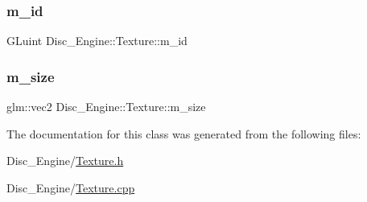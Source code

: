 \subsubsection{\texorpdfstring{m\+\_\+id}{m\_id}}
{\footnotesize\ttfamily G\+Luint Disc\+\_\+\+Engine\+::\+Texture\+::m\+\_\+id\hspace{0.3cm}{\ttfamily [private]}}

\mbox{\label{class_disc___engine_1_1_texture_a400d4a50bbdee9742fe6dbb15331ab17}} 
\subsubsection{\texorpdfstring{m\+\_\+size}{m\_size}}
{\footnotesize\ttfamily glm\+::vec2 Disc\+\_\+\+Engine\+::\+Texture\+::m\+\_\+size\hspace{0.3cm}{\ttfamily [private]}}



The documentation for this class was generated from the following files\+:\begin{DoxyCompactItemize}
\item 
Disc\+\_\+\+Engine/\mbox{\hyperlink{_texture_8h}{Texture.\+h}}\item 
Disc\+\_\+\+Engine/\mbox{\hyperlink{_texture_8cpp}{Texture.\+cpp}}\end{DoxyCompactItemize}
